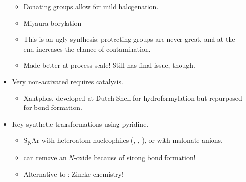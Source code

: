 \documentclass[../notes.tex]{subfiles}
\begin{document}
\begin{itemize}
\begin{itemize}
        \item Donating groups allow for mild halogenation.
        \item Miyaura borylation.
        \item This is an ugly synthesis; protecting groups are never great, and  at the end increases the chance of contamination.
        \item Made better at process scale! Still has final  issue, though.
    \end{itemize}
    \item Very non-activated  requires  catalysis.
    \begin{itemize}
        \item Xantphos, developed at Dutch Shell for hydroformylation but repurposed for  bond formation.
    \end{itemize}
    \item Key synthetic transformations using pyridine.
    \begin{itemize}
        \item S\textsubscript{N}Ar with heteroatom nucleophiles (, , ), or with malonate anions.
        \item {} can remove an \emph{N}-oxide because of strong  bond formation!
        \item Alternative to : Zincke chemistry!
    \end{itemize}
\end{itemize}
\end{document}
